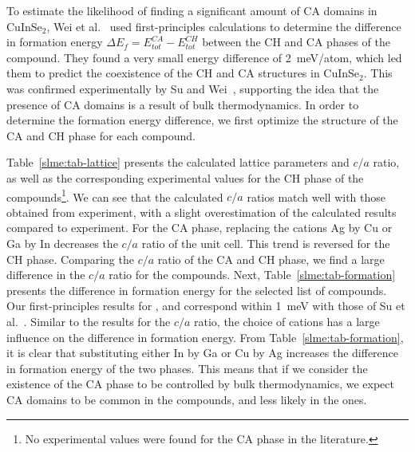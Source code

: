 \begin{refsection}
To estimate the likelihood of finding a significant amount of CA domains in 
CuInSe$_2$, Wei et al.~\cite{Wei1999} used first-principles calculations to 
determine the difference in formation energy $\Delta E_f = E_{tot}^{CA} - 
E_{tot}^{CH}$ between the CH and CA phases of the compound. They found a very 
small energy difference of 2~\si{\milli\electronvolt}/atom, which led them to 
predict the coexistence of the CH and CA structures in CuInSe$_2$. This was 
confirmed experimentally by Su and Wei~\cite{Su1999}, supporting the idea that 
the presence of CA domains is a result of bulk thermodynamics. In order to 
determine the formation energy difference, we first optimize the structure of 
the CA and CH phase for each compound. 
 
Table~\ref{slme:tab-lattice} presents the calculated lattice parameters and 
$c/a$ ratio, as well as the corresponding experimental values 
for the CH phase of the compounds\footnote[3]{No experimental values were 
found for the CA phase in the literature.}. We can see that the calculated 
$c/a$ ratios match well with those obtained from experiment, with a slight overestimation of the calculated results compared to experiment. For the CA phase, 
replacing the cations Ag by Cu or Ga by In decreases the $c/a$ ratio of the 
unit cell. This trend is reversed for the CH phase. Comparing the $c/a$ 
ratio of the CA and CH phase, we find a large difference in the $c/a$ ratio 
for the \mbox{} compounds. Next, Table~\ref{slme:tab-formation} 
presents the difference in formation energy for the selected list of 
compounds. Our first-principles results for ,  and 
 correspond within 1~\si{\milli\electronvolt} with those of Su et al.~\cite{Su1999}. Similar to 
the results for the $c/a$ ratio, the choice of cations has a large influence 
on the difference in formation energy. From Table~\ref{slme:tab-formation}, it is 
clear that substituting either In by Ga or Cu by Ag increases the difference 
in formation energy of the two phases. This means that if we consider the 
existence of the CA phase to be controlled by bulk thermodynamics, we expect 
CA domains to be common in the \mbox{} compounds, and less likely 
in the \mbox{} ones.  


\end{refsection}
